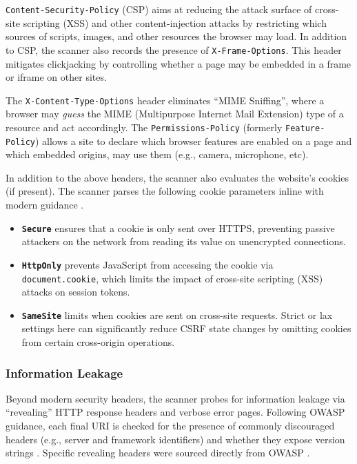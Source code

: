 \documentclass[conference]{IEEEtran}
\begin{document}
\texttt{Content-Security-Policy} (CSP) aims at reducing the 
attack surface of cross-site scripting (XSS) and other content-injection attacks by restricting which 
sources of scripts, images, and other resources the browser may load. In addition to CSP, the scanner also
records the presence of \texttt{X-Frame-Options}. This header mitigates clickjacking by controlling whether a page may be 
embedded in a frame or iframe on other sites.

The \texttt{X-Content-Type-Options} header eliminates 
``MIME Sniffing'', where a browser may \emph{guess} the MIME (Multipurpose Internet Mail Extension) type of a 
resource and act accordingly. \vspace{1em}The \texttt{Permissions-Policy} (formerly \texttt{Feature-Policy}) allows a site to declare which browser
features are enabled on a page and which embedded origins, may use them (e.g., camera, microphone, etc). 

In addition to the above headers, the scanner also evaluates the website's cookies (if present). 
The scanner parses the following cookie parameters inline with modern guidance \cite{cccs_itsp_40_111,mdn_secure_cookie_configuration}.

\begin{itemize}
  \item \textbf{\texttt{Secure}} ensures that a cookie is only sent over HTTPS, preventing passive attackers on the network from reading its value on unencrypted connections.
  \item \textbf{\texttt{HttpOnly}} prevents JavaScript from accessing the cookie via \texttt{document.cookie}, which limits the impact of cross-site scripting (XSS) attacks on session tokens.
  \item \textbf{\texttt{SameSite}} limits when cookies are sent on cross-site requests. Strict or lax settings here can significantly reduce CSRF state changes by omitting cookies from certain cross-origin operations.
\end{itemize}


\subsubsection{Information Leakage}


Beyond modern security headers, the scanner probes for information leakage via ``revealing'' HTTP response headers and verbose error pages. 
Following OWASP guidance, each final URI is checked for the presence of commonly discouraged headers (e.g., server and framework identifiers) and 
whether they expose version strings \cite{owasp_secure_headers_project,owasp_http_security_response_headers}. Specific revealing
headers were sourced directly from OWASP \cite{owasp_secure_headers_remove_json}.
\end{document}
